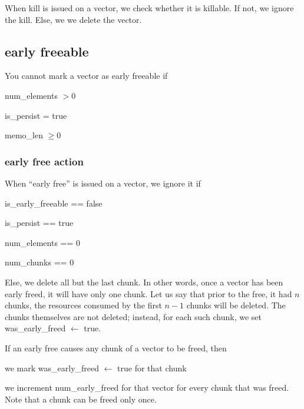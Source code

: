When kill is issued on a vector, we check whether it is killable. If not, we
ignore the kill. Else, we we delete the vector. 


\subsection{early freeable}

You cannot mark a vector as early freeable if 
\be
\item num\_elements \(> 0\)
\item is\_persist = true 
\item memo\_len \(\geq 0\)
\ee

\subsubsection{early free action}

When ``early free'' is issued on a vector, we ignore it if 
\be
\item is\_early\_freeable == false
\item is\_persist == true
\item num\_elements == 0 
\item num\_chunks == 0 
\ee

Else, we delete all but the last chunk. In other words, once a vector has been
early freed, it will have only one chunk. Let us say that prior to the free, it
had \(n\) chunks, the resources consumed by the first \(n-1\) chunks will be
deleted. The chunks themselves are not deleted; instead, for each such chunk, we set 
was\_early\_freed \(\leftarrow\) true. 

If an early free causes any chunk of a vector to be freed, then
\be
\item we mark was\_early\_freed \(\leftarrow\) true for that chunk
\item we increment num\_early\_freed for that vector for every chunk that was
freed. Note that a chunk can be freed only once. 
\ee


